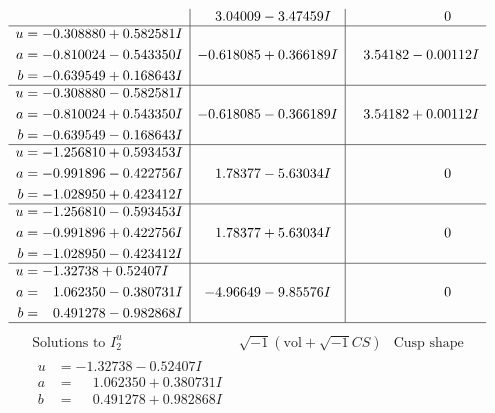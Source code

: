 \documentclass[1p]{elsarticle_modified}
\theoremstyle{definition}
\newcommand{\I}{\sqrt{-1}}
\begin{document}
$$\begin{array}{c|c|c}
 & \phantom{-}3.04009 - 3.47459 I & \phantom{-0.000000 } 0 \\ \hline\begin{aligned}
u &= -0.308880 + 0.582581 I \\
a &= -0.810024 - 0.543350 I \\
b &= -0.639549 + 0.168643 I\end{aligned}
 & -0.618085 + 0.366189 I & \phantom{-}3.54182 - 0.00112 I \\ \hline\begin{aligned}
u &= -0.308880 - 0.582581 I \\
a &= -0.810024 + 0.543350 I \\
b &= -0.639549 - 0.168643 I\end{aligned}
 & -0.618085 - 0.366189 I & \phantom{-}3.54182 + 0.00112 I \\ \hline\begin{aligned}
u &= -1.256810 + 0.593453 I \\
a &= -0.991896 - 0.422756 I \\
b &= -1.028950 + 0.423412 I\end{aligned}
 & \phantom{-}1.78377 - 5.63034 I & \phantom{-0.000000 } 0 \\ \hline\begin{aligned}
u &= -1.256810 - 0.593453 I \\
a &= -0.991896 + 0.422756 I \\
b &= -1.028950 - 0.423412 I\end{aligned}
 & \phantom{-}1.78377 + 5.63034 I & \phantom{-0.000000 } 0 \\ \hline\begin{aligned}
u &= -1.32738 + 0.52407 I \\
a &= \phantom{-}1.062350 - 0.380731 I \\
b &= \phantom{-}0.491278 - 0.982868 I\end{aligned}
 & -4.96649 - 9.85576 I & \phantom{-0.000000 } 0\\
 \hline 
 \end{array}$$\newpage$$\begin{array}{c|c|c}  
\text{Solutions to }I^u_{2}& \I (\text{vol} + \sqrt{-1}CS) & \text{Cusp shape}\\
 \hline 
\begin{aligned}
u &= -1.32738 - 0.52407 I \\
a &= \phantom{-}1.062350 + 0.380731 I \\
b &= \phantom{-}0.491278 + 0.982868 I\end{aligned}

\end{array}$$
\end{document}
